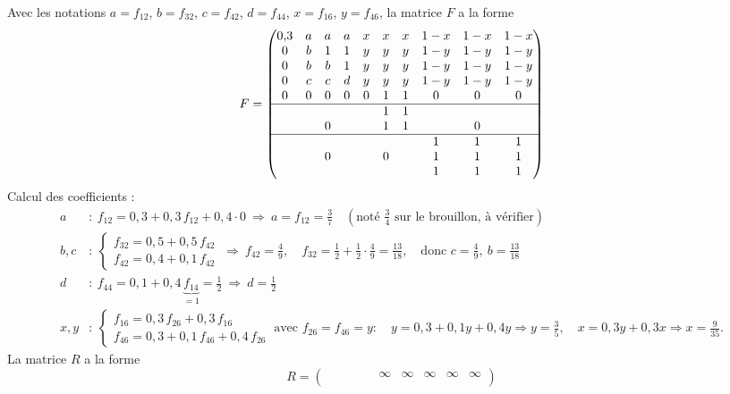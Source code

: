 \begin{exemple}[graphe de la chaîne de Markov sur Moodle, $E = \{1, \dots, 10\}$]
Avec les notations $a = f_{12}$, $b = f_{32}$, $c = f_{42}$, $d = f_{44}$, $x = f_{16}$, $y = f_{46}$, la matrice $F$ a la forme
\[
F =
\begin{pmatrix}
0{,}3 & a & a & a & x & x & x & 1-x & 1-x & 1-x \\
0 & b & 1 & 1 & y & y & y & 1-y & 1-y & 1-y \\
0 & b & b & 1 & y & y & y & 1-y & 1-y & 1-y \\
0 & c & c & d & y & y & y & 1-y & 1-y & 1-y \\
0 & 0 & 0 & 0 & 0 & 1 & 1 & 0 & 0 & 0 \\
\hline
 & & & & & 1 & 1 & & & \\
 & & 0 & & & 1 & 1 & & 0 & \\
\hline
 & & & & & & & 1 & 1 & 1 \\
 & & 0 & & & 0 & & 1 & 1 & 1 \\
 & & & & & & & 1 & 1 & 1
\end{pmatrix}
\]
Calcul des coefficients :
\begin{align*}
a &: \ f_{12} = 0{,}3 + 0{,}3\, f_{12} + 0{,}4 \cdot 0
   \ \Longrightarrow\ a = f_{12} = \tfrac{3}{7} \quad (\text{noté } \tfrac34 \text{ sur le brouillon, à vérifier}) \\
b, c &: \
\begin{cases}
f_{32} = 0{,}5 + 0{,}5\, f_{42} \\
f_{42} = 0{,}4 + 0{,}1\, f_{42}
\end{cases}
\ \Longrightarrow\ f_{42} = \tfrac{4}{9},\quad f_{32} = \tfrac12 + \tfrac12 \cdot \tfrac49 = \tfrac{13}{18},
\quad \text{donc } c = \tfrac49,\ b = \tfrac{13}{18} \\
d &: \ f_{44} = 0{,}1 + 0{,}4\, \underbrace{f_{14}}_{=1} = \tfrac12 \ \Longrightarrow\ d = \tfrac12 \\
x, y &: \
\begin{cases}
f_{16} = 0{,}3\, f_{26} + 0{,}3\, f_{16} \\
f_{46} = 0{,}3 + 0{,}1\, f_{46} + 0{,}4\, f_{26}
\end{cases}
\ \text{avec } f_{26} = f_{46} = y :\quad
y = 0{,}3 + 0{,}1 y + 0{,}4 y \Rightarrow y = \tfrac35,\quad
x = 0{,}3 y + 0{,}3 x \Rightarrow x = \tfrac{9}{35}.
\end{align*}
La matrice $R$ a la forme
\[
R =
\begin{pmatrix}
 & & & & & \infty & \infty & \infty & \infty & \infty \\

\end{pmatrix}\]
\end{exemple}
